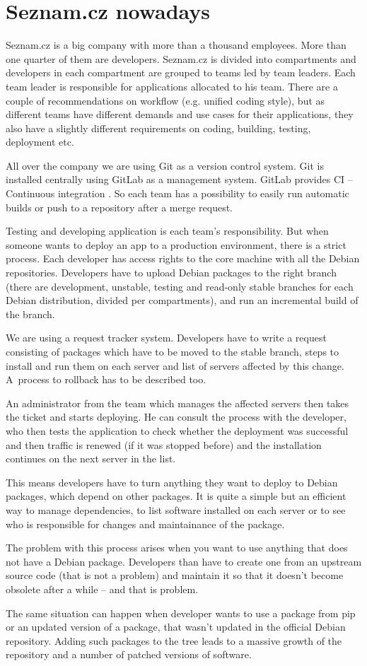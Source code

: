 \chapter{Seznam.cz nowadays}

Seznam.cz is a big company with more than a thousand employees. More than one quarter of them are developers. Seznam.cz is divided into compartments and developers in each compartment are grouped to teams led by team leaders. Each team leader is responsible for applications allocated to his team. There are a couple of recommendations on workflow (e.g. unified coding style),  but as different teams have different demands and use cases for their applications, they also have a slightly different requirements on coding, building, testing, deployment etc.

All over the company we are using Git as a version control system. Git is installed centrally using GitLab as a management system. GitLab provides CI – Continuous integration \cite{gitlabci}.
So each team has a possibility to easily run automatic builds or push to a repository after a merge request.

Testing and developing application is each team’s responsibility. But when someone wants to deploy an app to a production environment, there is a strict process. Each developer has access rights to the core machine with all the Debian \cite{debian} repositories. Developers have to upload Debian packages to the right branch (there are development, unstable, testing and read-only stable branches for each Debian distribution, divided per compartments), and run an incremental build of the branch.

We are using a request tracker system. Developers have to write a request consisting of packages which have to be moved to the stable branch, steps to install and run them on each server and list of servers affected by this change. A~process to rollback has to be described too.

An administrator from the team which manages the affected servers then takes the ticket and starts deploying. He can consult the process with the developer, who then tests the application to check whether the deployment was successful and then traffic is renewed (if it was stopped before) and the installation continues on the next server in the list.

This means developers have to turn anything they want to deploy to Debian packages, which depend on other packages. It is quite a simple but an efficient way to manage dependencies, to list software installed on each server or to see who is responsible for changes and maintainance of the package.

The problem with this process arises when you want to use anything that does not have a Debian package. Developers than have to create one from an upstream source code (that is not a problem) and maintain it so that it doesn’t become obsolete after a while – and that is problem.

The same situation can happen when developer wants to use a package from pip or an updated version of a package, that wasn’t updated in the official Debian repository. Adding such packages to the tree leads to a massive growth of the repository and a number of patched versions of software.
